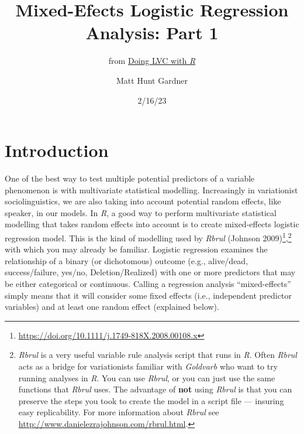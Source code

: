 \documentclass[
  10pt,
  letterpaper]{article}
\title{Mixed-Efects Logistic Regression Analysis: Part 1}
\subtitle{from
\href{https://lingmethodshub.github.io/content/R/lvc_r/}{Doing LVC with
\emph{R}}}
\author{Matt Hunt Gardner}
\date{2/16/23}
\renewcommand\texttt[1]{{\ttfamily\color{BrickRed}#1}}
\renewcommand*\contentsname{Table of contents}
\newcommand\contentsname{Table of contents}
\DeclareRobustCommand{\href}[2]{#2\footnote{\url{#1}}}
\begin{document}
\maketitle
\ifdefined\Shaded\renewenvironment{Shaded}{\begin{tcolorbox}[boxrule=0pt, sharp corners, breakable, borderline west={3pt}{0pt}{shadecolor}, interior hidden, frame hidden, enhanced]}{\end{tcolorbox}}\fi

\renewcommand*\contentsname{Table of contents}
{
\hypersetup{linkcolor=}
\setcounter{tocdepth}{3}
\tableofcontents
}
\hypertarget{introduction}{%
\section{Introduction}\label{introduction}}

One of the best way to test multiple potential predictors of a variable
phenomenon is with multivariate statistical modelling. Increasingly in
variationist sociolinguistics, we are also taking into account potential
random effects, like speaker, in our models. In \emph{R}, a good way to
perform multivariate statistical modelling that takes random effects
into account is to create mixed-effects logistic regression model. This
is the kind of modelling used by \emph{Rbrul}
\href{https://doi.org/10.1111/j.1749-818X.2008.00108.x}{(Johnson
2009)},\footnote{\emph{Rbrul} is a very useful variable rule analysis
  script that runs in \emph{R}. Often \emph{Rbrul} acts as a bridge for
  variationists familiar with \emph{Goldvarb} who want to try running
  analyses in \emph{R}. You can use \emph{Rbrul}, or you can just use
  the same functions that \emph{Rbrul} uses. The advantage of
  \textbf{not} using \emph{Rbrul} is that you can preserve the steps you
  took to create the model in a script file --- insuring easy
  replicability. For more information about \emph{Rbrul} see
  \url{http://www.danielezrajohnson.com/rbrul.html}.} with which you may
already be familiar. Logistic regression examines the relationship of a
binary (or dichotomous) outcome (e.g., alive/dead, success/failure,
yes/no, \texttt{Deletion}/\texttt{Realized}) with one or more predictors
that may be either categorical or continuous. Calling a regression
analysis ``mixed-effects'' simply means that it will consider some fixed
effects (i.e., independent predictor variables) and at least one random
effect (explained below).
\end{document}
